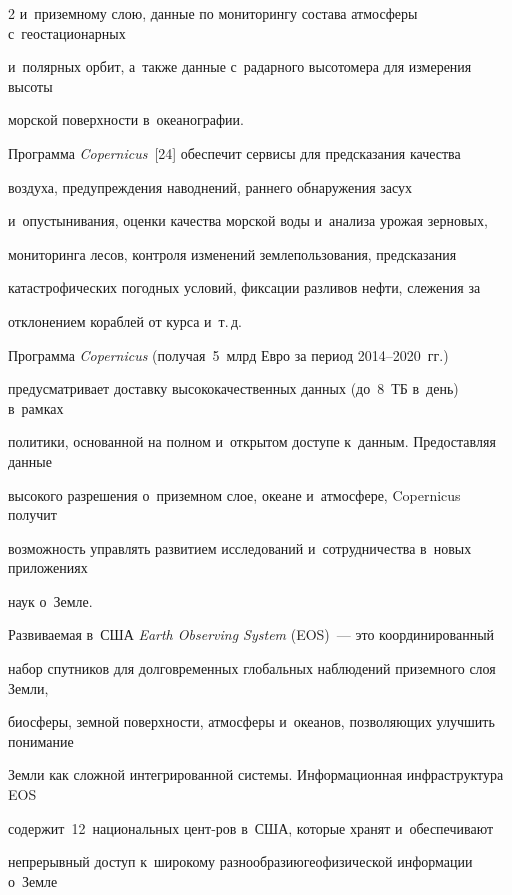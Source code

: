 \begin{multicols}{2}
и~приземному слою, данные по мониторингу состава атмосферы с~геостационарных 


и~полярных орбит, а~также данные с~радарного высотомера для измерения высоты 


морской поверхности в~океанографии.


  


  Программа \textit{Copernicus}~[24] обеспечит сервисы для предсказания качества 


воздуха,  пред\-упреж\-дения наводнений, раннего обнаружения засух 


и~опус\-ты\-ни\-ва\-ния, оценки качества морской воды и~анализа урожая зерновых, 


мониторинга лесов, контроля изменений землепользования, предсказания 


катастрофических погодных условий, фиксации разливов нефти, слежения за 


отклонением кораблей от курса и~т.\,д. 


  


  Программа \textit{Copernicus} (получая~5~млрд Евро за период 2014--2020~гг.)\ 


предусматривает доставку высококачественных данных (до~8~ТБ в~день) в~рамках 


политики, основанной на полном и~открытом доступе к~данным. Предоставляя данные 


высокого разрешения о~приземном слое, океане и~атмосфере, Copernicus получит 


возможность управлять развитием исследований и~сотрудничества в~новых приложениях 


наук о~Земле.


  


  Развиваемая в~США \textit{Earth Observing System} (EOS)~--- это координированный 


набор спутников для долговременных глобальных наблюдений приземного слоя Земли, 


биосферы, земной по\-вер\-хности, атмосферы и~океанов, позволяющих улучшить понимание 


Земли как сложной интегрированной системы. Информационная инфраструктура EOS 


содержит~12~национальных цент-\linebreak ров в~США, которые хранят и~обеспечивают 


непрерывный доступ к~широкому разнообразию\linebreak геофизической информации о~Земле 



\end{multicols}
